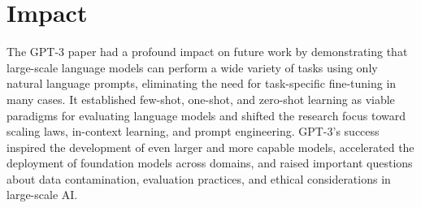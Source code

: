\documentclass[10pt]{article}
\begin{document}
\section*{Impact}
The GPT-3 paper had a profound impact on future work by demonstrating that large-scale language models can perform a wide variety of tasks using only natural language prompts, eliminating the need for task-specific fine-tuning in many cases. It established few-shot, one-shot, and zero-shot learning as viable paradigms for evaluating language models and shifted the research focus toward scaling laws, in-context learning, and prompt engineering. GPT-3's success inspired the development of even larger and more capable models, accelerated the deployment of foundation models across domains, and raised important questions about data contamination, evaluation practices, and ethical considerations in large-scale AI.



\end{document}
